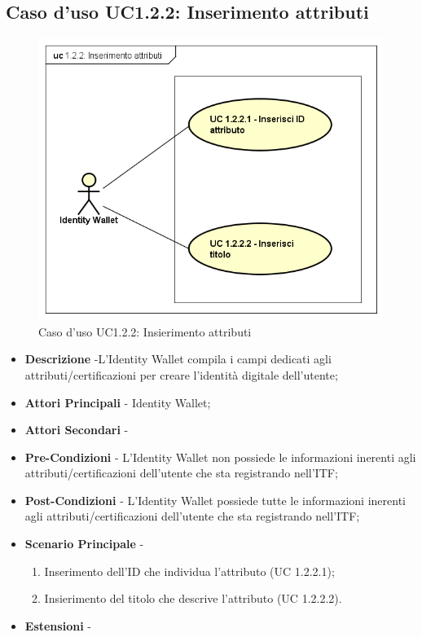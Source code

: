\subsection{Caso d'uso UC1.2.2: Inserimento attributi}
\begin{figure}[h]
	\centering
	\includegraphics[scale=0.50]{immagini/usecase/UC122_InserimentoAttributi}
	\caption{Caso d'uso UC1.2.2: Insierimento attributi}
\end{figure}
\begin{itemize}
	\item \textbf{Descrizione} -L'Identity Wallet compila i campi dedicati agli attributi/certificazioni per creare l'identità digitale dell'utente;
	\item \textbf{Attori Principali} - Identity Wallet;
	\item \textbf{Attori Secondari} -
	\item \textbf{Pre-Condizioni} - L'Identity Wallet non possiede le informazioni inerenti agli attributi/certificazioni dell'utente che sta registrando nell'\gls{ITF};
	\item \textbf{Post-Condizioni} - L'Identity Wallet possiede tutte le informazioni inerenti agli attributi/certificazioni dell'utente che sta registrando nell'\gls{ITF};
	\item \textbf{Scenario Principale} -
	\begin{enumerate}
		\item Inserimento dell'ID che individua l'attributo (UC 1.2.2.1);
		\item Insierimento del titolo che descrive l'attributo (UC 1.2.2.2).
	\end{enumerate}
	\item \textbf{Estensioni} -
\end{itemize}
